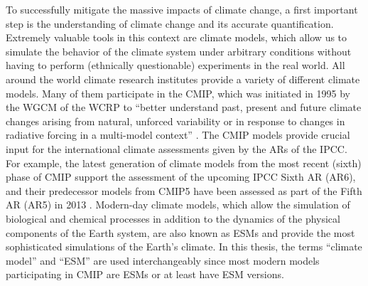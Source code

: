 To successfully mitigate the massive impacts of climate change, a first
important step is the understanding of climate change and its accurate
quantification. Extremely valuable tools in this context are climate models,
which allow us to simulate the behavior of the climate system under arbitrary
conditions without having to perform (ethnically questionable) experiments in
the real world. All around the world climate research institutes provide a
variety of different climate models. Many of them participate in the \ac{CMIP},
which was initiated in 1995 by the \ac{WGCM} of the \ac{WCRP} to
\enquote{better understand past, present and future climate changes arising
  from natural, unforced variability or in response to changes in radiative
  forcing in a multi-model context} \autocite{WCRP2020}. The \ac{CMIP} models
provide crucial input for the international climate assessments given by the
\acp{AR} of the \ac{IPCC}. For example, the latest generation of climate models
from the most recent (sixth) phase of \ac{CMIP}  support the assessment of the upcoming \ac{IPCC} Sixth
\acl{AR} (\acs{AR}6), and their predecessor models from \acs{CMIP}5
\autocite{Taylor2012} have been assessed as part of the Fifth \acl{AR}
(\acs{AR}5) in 2013 \autocite{Flato2013}. Modern-day climate models, which
allow the simulation of biological and chemical processes in addition to the
dynamics of the physical components of the Earth system, are also known as
\acp{ESM} and provide the most sophisticated simulations of the Earth's
climate. In this thesis, the terms \enquote{climate model} and
\enquote{\acl{ESM}} are used interchangeably since most modern models
participating in \ac{CMIP} are \acp{ESM} or at least have \ac{ESM} versions.

